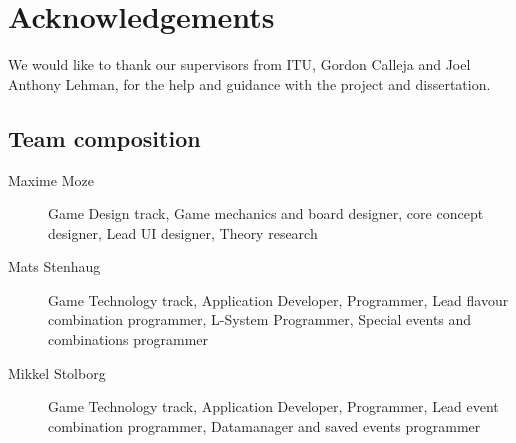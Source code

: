 \chapter{Acknowledgements}
We would like to thank our supervisors from ITU, Gordon Calleja and Joel Anthony Lehman, for the help and guidance with the project and dissertation. 

\section{Team composition}

\begin{description}
\item[Maxime Moze] Game Design track, Game mechanics and board designer, core concept designer, Lead UI designer, Theory research
\item[Mats Stenhaug] Game Technology track, Application Developer, Programmer, Lead flavour combination programmer, L-System Programmer, Special events and combinations programmer
\item[Mikkel Stolborg] Game Technology track, Application Developer, Programmer, Lead event combination programmer, Datamanager and saved events programmer
\end{description}
